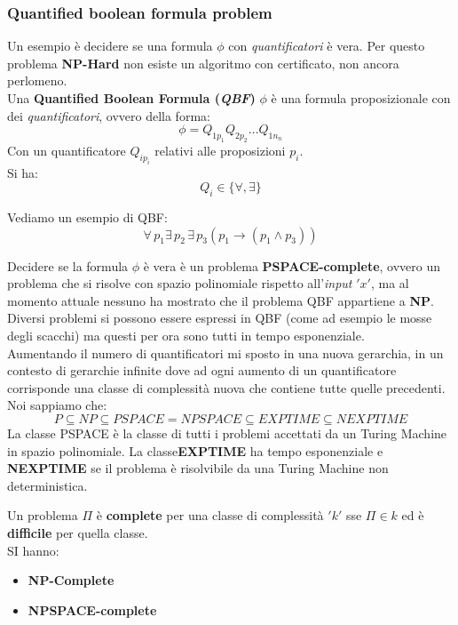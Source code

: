 										\subsubsection{Quantified boolean formula problem}
										Un esempio è decidere se una formula $\phi$ con \textit{quantificatori} è
										vera. Per questo problema \textbf{NP-Hard} non esiste un algoritmo con
										certificato, non ancora perlomeno.\\
										Una \textbf{Quantified Boolean Formula (\textit{QBF})} $\phi$ è una formula
										proposizionale con dei \textit{quantificatori}, ovvero della forma:
										\[\phi=Q_{1p_1}Q_{2p_2}\ldots Q_{1n_n}\]
										Con un quantificatore $Q_{ip_i}$ relativi alle proposizioni $p_i$.\\
										Si ha:
										\[Q_i\in\{\forall,\exists\}\]
										\begin{esempio}
											Vediamo un esempio di QBF:
											\[\forall\, p_1\exists\,p_2\,\exists\, p_3(p_1\to(p_1\land p_3))\]
										\end{esempio}
										Decidere se la formula $\phi$ è vera è un problema \textbf{PSPACE-complete},
										ovvero un problema che si risolve con spazio polinomiale rispetto all'\textit{input} $ 'x' $,
										ma al momento attuale nessuno ha mostrato che il problema QBF appartiene a
										\textbf{NP}.\\
										Diversi problemi si possono essere espressi in QBF (come ad esempio le mosse degli
										scacchi) ma questi per ora sono tutti in tempo esponenziale.\\
										Aumentando il numero di quantificatori mi sposto in una nuova gerarchia, in un
										contesto di gerarchie infinite dove ad ogni aumento di un quantificatore
										corrisponde una classe di complessità nuova che contiene tutte quelle
										precedenti.\\
										Noi sappiamo che:
										\[P\subseteq NP\subseteq PSPACE=NPSPACE\subseteq EXPTIME\subseteq NEXPTIME\]
										La classe PSPACE è la classe di tutti i problemi accettati da un Turing Machine
										in spazio polinomiale. La classe\textbf{EXPTIME} ha tempo esponenziale e
										\textbf{NEXPTIME} se il problema è risolvibile da una Turing Machine non
										deterministica.
										\begin{definizione}
											Un problema $\Pi$ è \textbf{complete} per una classe di complessità $ 'k' $ sse 
											$\Pi\in k$ ed è \textbf{difficile} per quella classe.\\
											SI hanno:
											\begin{itemize}
												\item \textbf{NP-Complete}
												\item \textbf{NPSPACE-complete}
											\end{itemize}
										\end{definizione}



